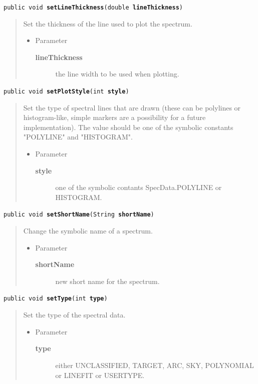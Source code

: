 \documentclass[twoside,11pt]{article}
\renewcommand{\_}{\texttt{\symbol{95}}}
\newcommand{\method}[1]{\texttt{#1}}
\newenvironment{desc}{\begin{quote}}{\end{quote}}
\begin{document}
\method{public void \textbf{setLineThickness}(\texttt{double} \textbf{lineThickness})\label{l109}\label{l110}}
\begin{desc}Set the thickness of the line used to plot the spectrum.
\begin{itemize}
\item{Parameter
  \begin{description}
   \item[\textbf{lineThickness}]{the line width to be used when plotting.}
  \end{description}}
\end{itemize}
\end{desc}

\method{public void \textbf{setPlotStyle}(\texttt{int} \textbf{style})\label{l111}\label{l112}}
\begin{desc}Set the type of spectral lines that are drawn (these can be
 polylines or histogram-like, simple markers are a possibility
 for a future implementation). The value should be one of the
 symbolic constants "POLYLINE" and "HISTOGRAM".
\begin{itemize}
\item{Parameter
  \begin{description}
   \item[\textbf{style}]{one of the symbolic contants SpecData.POLYLINE or
             HISTOGRAM.}
  \end{description}}
\end{itemize}
\end{desc}

\method{public void \textbf{setShortName}(\texttt{String} \textbf{shortName})\label{l113}\label{l114}}
\begin{desc}Change the symbolic name of a spectrum.
\begin{itemize}
\item{Parameter
  \begin{description}
   \item[\textbf{shortName}]{new short name for the spectrum.}
  \end{description}}
\end{itemize}
\end{desc}

\method{public void \textbf{setType}(\texttt{int} \textbf{type})\label{l115}\label{l116}}
\begin{desc}Set the type of the spectral data.
\begin{itemize}
\item{Parameter
  \begin{description}
   \item[\textbf{type}]{either UNCLASSIFIED, TARGET, ARC, SKY, POLYNOMIAL or
                    LINEFIT or USERTYPE.}
  \end{description}}
\end{itemize}
\end{desc}
\end{document}
